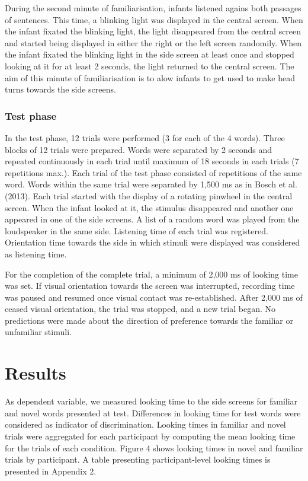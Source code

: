 \documentclass[man,floatsintext]{apa6}
\begin{document}
During the second minute of familiarisation, infants listened agains both passages of sentences. This time, a blinking light was displayed in the central screen. When the infant fixated the blinking light, the light disappeared from the central screen and started being displayed in either the right or the left screen randomily. When the infant fixated the blinking light in the side screen at least once and stopped looking at it for at least 2 seconds, the light returned to the central screen. The aim of this minute of familiarisation is to alow infants to get used to make head turns towards the side screens.

\hypertarget{test-phase}{%
\subsubsection{Test phase}\label{test-phase}}

In the test phase, 12 trials were performed (3 for each of the 4 words). Three blocks of 12 trials were prepared. Words were separated by 2 seconds and repeated continuously in each trial until maximum of 18 seconds in each trials (7 repetitions max.). Each trial of the test phase consisted of repetitions of the same word. Words within the same trial were separated by 1,500 ms as in Bosch et al. (2013). Each trial started with the display of a rotating pinwheel in the central screen. When the infant looked at it, the stimulus disappeared and another one appeared in one of the side screens. A list of a random word was played from the loudspeaker in the same side. Listening time of each trial was registered. Orientation time towards the side in which stimuli were displayed was considered as listening time.

For the completion of the complete trial, a minimum of 2,000 ms of looking time was set. If visual orientation towards the screen was interrupted, recording time was paused and resumed once visual contact was re-established. After 2,000 ms of ceased visual orientation, the trial was stopped, and a new trial began. No predictions were made about the direction of preference towards the familiar or unfamiliar stimuli.

\hypertarget{results}{%
\section{Results}\label{results}}

As dependent variable, we measured looking time to the side screens for familiar and novel words presented at test. Differences in looking time for test words were considered as indicator of discrimination. Looking times in familiar and novel trials were aggregated for each participant by computing the mean looking time for the trials of each condition. Figure 4 shows looking times in novel and familiar trials by participant. A table presenting participant-level looking times is presented in Appendix 2.
\end{document}
